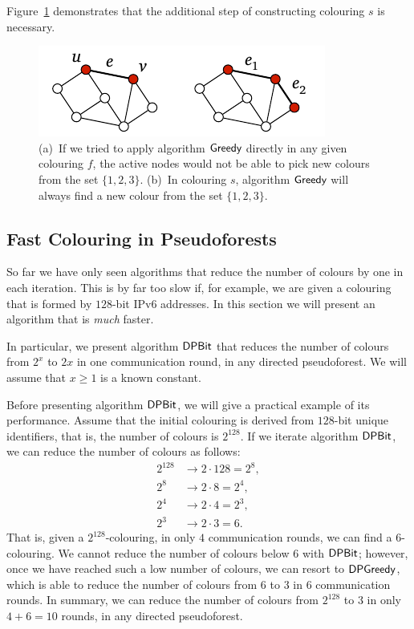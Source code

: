 Figure~\ref{fig:dpcritical} demonstrates that the additional step of constructing colouring $s$ is necessary.

\begin{figure}
    \centering
    \includegraphics[page=\PDPCritical]{figs.pdf}
    \caption{(a)~If we tried to apply algorithm $\textsf{Greedy}$ directly in any given colouring $f$, the active nodes would not be able to pick new colours from the set $\{1,2,3\}$. (b)~In colouring $s$, algorithm $\textsf{Greedy}$ will always find a new colour from the set $\{1,2,3\}$.}\label{fig:dpcritical}
\end{figure}

\subsection{Fast Colouring in Pseudoforests}\label{ssec:dpbit}

So far we have only seen algorithms that reduce the number of colours by one in each iteration. This is by far too slow if, for example, we are given a colouring that is formed by $128$-bit IPv6 addresses. In this section we will present an algorithm that is \emph{much} faster.

In particular, we present algorithm $\textsf{DPBit}$ that reduces the number of colours from $2^x$ to $2x$ in one communication round, in any directed pseudoforest. We will assume that $x \ge 1$ is a known constant.

Before presenting algorithm $\textsf{DPBit}$, we will give a practical example of its performance. Assume that the initial colouring is derived from $128$-bit unique identifiers, that is, the number of colours is $2^{128}$. If we iterate algorithm $\textsf{DPBit}$, we can reduce the number of colours as follows:
\begin{align*}
    2^{128} &\to 2 \cdot 128 = 2^8, \\
    2^8 &\to 2 \cdot 8 = 2^4, \\
    2^4 &\to 2 \cdot 4 = 2^3, \\
    2^3 &\to 2 \cdot 3 = 6.
\end{align*}
That is, given a $2^{128}$-colouring, in only $4$ communication rounds, we can find a $6$-colouring. We cannot reduce the number of colours below $6$ with $\textsf{DPBit}$; however, once we have reached such a low number of colours, we can resort to $\textsf{DPGreedy}$, which is able to reduce the number of colours from $6$ to $3$ in $6$ communication rounds. In summary, we can reduce the number of colours from $2^{128}$ to $3$ in only $4+6 = 10$ rounds, in any directed pseudoforest.

